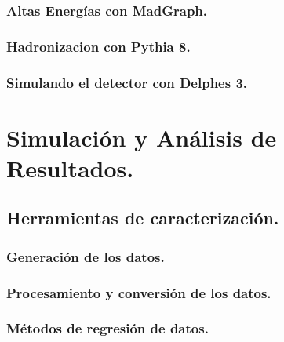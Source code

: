\documentclass[12pt]{report}
\begin{document}
		\subsection{Altas Energías con MadGraph.}\label{C_madgraph}
		

		\subsection{Hadronizacion con Pythia 8.}\label{C_pythia8}
		

		\subsection{Simulando el detector con Delphes 3.}\label{C_delphes}
		


\chapter{Simulación y Análisis de Resultados.}


    \section{Herramientas de caracterización.}
    
    
        \subsection{Generación de los datos.}\label{Cap_genera}
        
        
        \subsection{Procesamiento y conversión de los datos.}
        
        
        \subsection{Métodos de regresión de datos.}
        \label{Cap_regresion}
    
\end{document}
